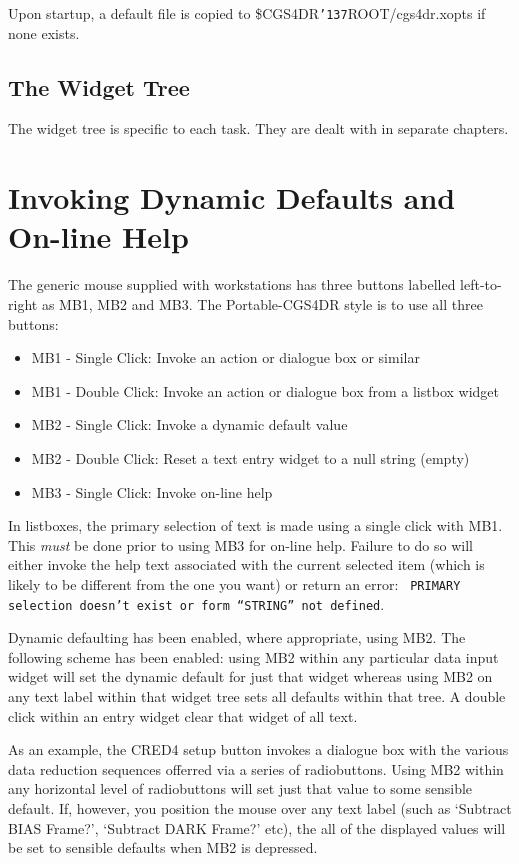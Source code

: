 \documentclass[a4paper]{book}
\renewcommand{\_}{{\tt\char'137}}
\begin{document}
Upon startup, a default file is copied to \$CGS4DR\_ROOT/cgs4dr.xopts if none exists.

\subsection{The Widget Tree}
The widget tree is specific to each task. They are dealt with in separate chapters.

\section{Invoking Dynamic Defaults and On-line Help}
The generic mouse supplied with workstations has three buttons labelled
left-to-right as MB1, MB2 and MB3. The Portable-CGS4DR style is to use
all three buttons:

\begin{itemize}
\item MB1 - Single Click: Invoke an action or dialogue box or similar
\item MB1 - Double Click: Invoke an action or dialogue box from a listbox widget
\item MB2 - Single Click: Invoke a dynamic default value
\item MB2 - Double Click: Reset a text entry widget to a null string (empty)
\item MB3 - Single Click: Invoke on-line help
\end{itemize}

In listboxes, the primary selection of text is made using a single click with MB1.
This {\em must} be done prior to using MB3 for on-line help. Failure to do so will
either invoke the help text associated with the current selected item (which is
likely to be different from the one you want) or return an error: {\tt
PRIMARY selection doesn't exist or form ``STRING'' not defined}.

Dynamic defaulting has been enabled, where appropriate, using MB2. The following
scheme has been enabled: using MB2 within any particular data input widget will set the
dynamic default for just that widget whereas using MB2 on any text label within
that widget tree sets all defaults within that tree. A double click within an entry
widget clear that widget of all text.

As an example, the CRED4 setup button invokes a dialogue box with the various
data reduction sequences offerred via a series of radiobuttons. Using MB2
within any horizontal level of radiobuttons will set just that value to some
sensible default. If, however, you position the mouse over any text label
(such as `Subtract BIAS Frame?', `Subtract DARK Frame?' etc), the all of the
displayed values will be set to sensible defaults when MB2 is depressed.
\end{document}
